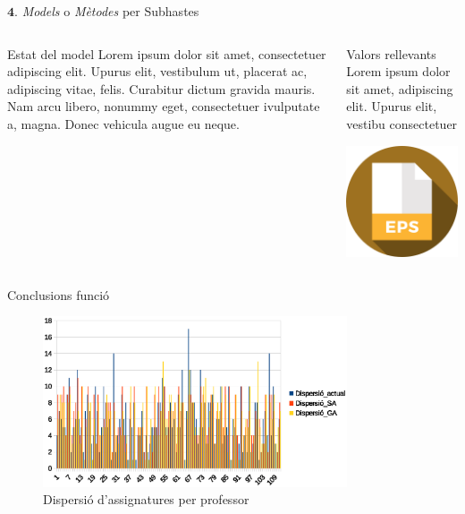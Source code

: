 \documentclass[twocolumn]{beamer}
\begin{document}
\begin{frame}{$\mathbf 4.$ \textit{Models} o \textit{Mètodes} per Subhastes}
\begin{columns}[t]
	\begin{column}{.5\textwidth}
		\begin{block}{Estat del model}
			Lorem ipsum dolor sit amet,
			consectetuer adipiscing elit. Upurus elit, vestibulum ut,
			placerat ac, adipiscing vitae,
			felis. Curabitur dictum gravida
			mauris. Nam arcu libero,
			nonummy eget, consectetuer ivulputate a, magna. Donec
			vehicula augue eu neque.
		\end{block}
	\end{column}
	\begin{column}{.5\textwidth}
		\begin{block}{Valors rellevants}
			Lorem ipsum dolor sit amet,
			adipiscing elit. Upurus elit, vestibu
			consectetuer 
		\end{block}
		\includegraphics[width=3.5cm]{eps}
	\end{column}
\end{columns}
\end{frame}


\begin{frame}{Conclusions funció}
\begin{figure}
	\includegraphics[width=9cm]{dispersio_diff_ga}
	\caption{Dispersió d'assignatures per professor}
\end{figure}
\end{frame}
\end{document}

